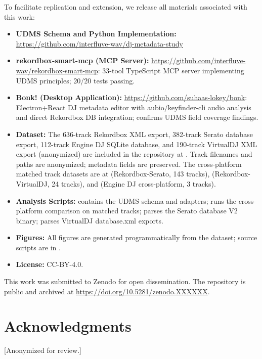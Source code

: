 \documentclass[letterpaper,10pt]{article}
\begin{document}
To facilitate replication and extension, we release all materials associated with this work:

\begin{itemize}
  \item \textbf{UDMS Schema and Python Implementation:} \url{https://github.com/interfluve-wav/dj-metadata-study}
  \item \textbf{rekordbox-smart-mcp (MCP Server):} \url{https://github.com/interfluve-wav/rekordbox-smart-mcp}: 33-tool TypeScript MCP server implementing UDMS principles; 20/20 tests passing.
  \item \textbf{Bonk! (Desktop Application):} \url{https://github.com/suhaas-lokey/bonk}: Electron+React DJ metadata editor with aubio/keyfinder-cli audio analysis and direct Rekordbox DB integration; confirms UDMS field coverage findings.
  \item \textbf{Dataset:} The 636-track Rekordbox XML export, 382-track Serato database export, 112-track Engine DJ SQLite database, and 190-track VirtualDJ XML export (anonymized) are included in the repository at . Track filenames and paths are anonymized; metadata fields are preserved. The cross-platform matched track datasets are at  (Rekordbox-Serato, 143 tracks),  (Rekordbox-VirtualDJ, 24 tracks), and  (Engine DJ cross-platform, 3 tracks).
  \item \textbf{Analysis Scripts:}  contains the UDMS schema and adapters;  runs the cross-platform comparison on matched tracks;  parses the Serato database V2 binary;  parses VirtualDJ database.xml exports.
  \item \textbf{Figures:} All figures are generated programmatically from the dataset; source scripts are in .
  \item \textbf{License:} CC-BY-4.0.
\end{itemize}

This work was submitted to Zenodo for open dissemination. The repository is public and archived at \url{https://doi.org/10.5281/zenodo.XXXXXX}.

\section*{Acknowledgments}

[Anonymized for review.]
\end{document}
